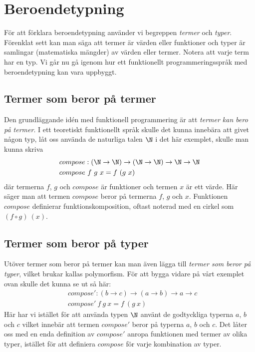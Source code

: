 \section{Beroendetypning}
För att förklara beroendetypning använder vi begreppen \emph{termer} och
\emph{typer}. Förenklat sett kan man säga att termer är värden eller funktioner
och typer är samlingar (matematiska mängder) av värden eller termer. Notera att
varje term har en typ. Vi går nu gå igenom hur ett funktionellt
programmeringsspråk med beroendetypning kan vara uppbyggt.

\subsection{Termer som beror på termer}
Den grundläggande idén med funktionell programmering är att \emph{termer kan
bero på termer}. I ett teoretiskt funktionellt språk skulle det kunna innebära
att givet någon typ, låt oss använda de naturliga talen $\N$ i det här
exemplet, skulle man kunna skriva
\begin{align*}
  &compose : (\N \to \N) \to (\N \to \N) \to \N \to \N \\
  &compose\ f\ g\ x = f\ (g\ x)
\end{align*}
där termerna $f$, $g$ och $compose$ är funktioner och termen $x$ är ett värde.
Här säger man att termen $compose$ beror på termerna $f$, $g$ och $x$.
Funktionen $compose$ definierar funktionskomposition, oftast noterad med en
cirkel som $(f \circ g)\ (x)$.


\subsection{Termer som beror på typer}
Utöver termer som beror på termer kan man även lägga till \emph{termer som
beror på typer}, vilket brukar kallas polymorfism. För att bygga vidare på vårt
exemplet ovan skulle det kunna se ut så här:
\begin{align*}
  &compose' : (b \to c) \to (a \to b) \to a \to c \\
  &compose'\ f\ g\ x = f\ (g\ x)
\end{align*}
Här har vi istället för att använda typen $\N$ använt de godtyckliga typerna
$a$, $b$ och $c$ vilket innebär att termen $compose'$ beror på typerna $a$, $b$
och $c$. Det låter oss med en enda definition av $compose'$ anropa funktionen
med termer av olika typer, istället för att definiera $compose$ för varje
kombination av typer.

